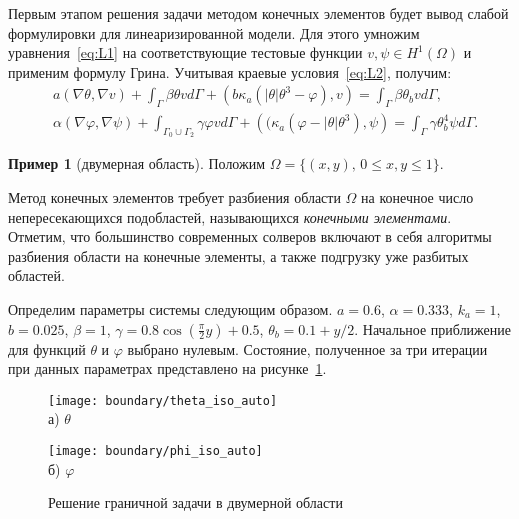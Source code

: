 Первым этапом решения задачи методом конечных элементов будет вывод слабой формулировки для
линеаризированной модели.
Для этого умножим уравнения~\eqref{eq:L1} на соответствующие тестовые функции
$v, \psi \in H^1(\Omega)$ и применим формулу Грина.
Учитывая краевые условия~\eqref{eq:L2}, получим:
\begin{equation*}
    \begin{aligned}
        & a( \nabla \theta, \nabla v ) + \int_\Gamma \beta \theta v d\Gamma
        + \left(b \kappa_a (| \theta | \theta^3 - \varphi ), v\right)
        = \int_\Gamma \beta \theta_b v d\Gamma,
        \\
        & \alpha (\nabla \varphi,\nabla \psi)
        + \int_{\Gamma_0 \cup \Gamma_2} \gamma \varphi v d\Gamma
        + \left( (\kappa_a (\varphi - |\theta|\theta^3), \psi\right)
        = \int_{\Gamma} \gamma \theta_b^4 \psi d\Gamma.
    \end{aligned}
\end{equation*}

\textbf{Пример 1} (двумерная область).
Положим $\Omega=\{(x,y),\, 0 \leq x,y \leq 1 \}$.

Метод конечных элементов требует разбиения области $\Omega$ на
конечное число непересекающихся подобластей, называющихся
\textit{конечными элементами}.
Отметим, что большинство современных солверов включают в себя
алгоритмы разбиения области на конечные элементы, а также подгрузку
уже разбитых областей.

Определим параметры системы следующим образом.
$a = 0.6$,
$\alpha = 0.333$,
$k_a = 1$,
$b = 0.025$,
$\beta = 1$,
$\gamma = 0.8 \cos\left(\frac{\pi}{2} y\right) + 0.5$,
$\theta_b = 0.1 + y / 2$.
Начальное приближение для функций $\theta$ и $\varphi$ выбрано нулевым.
Состояние, полученное за три итерации при данных параметрах представлено
на рисунке~\ref{fig:4_1:boundary}.
\begin{figure}[h!t]
    \begin{minipage}[b][][b]{0.49\linewidth}
        \centering
        \texttt{[image: boundary/theta\_iso\_auto]} \\ а) $\theta$
    \end{minipage}
    \hfill
    \begin{minipage}[b][][b]{0.49\linewidth}
        \centering
        \texttt{[image: boundary/phi\_iso\_auto]} \\ б) $\varphi$
    \end{minipage}
    \caption{Решение граничной задачи в двумерной области}
    \label{fig:4_1:boundary}
\end{figure}


